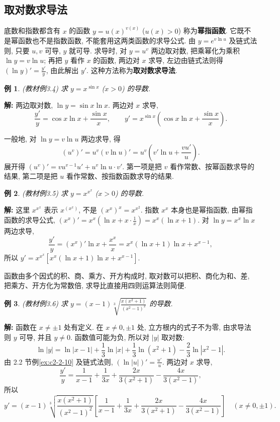\documentclass[UTF8,openany]{ctexbook}
\theoremstyle{chinesetextbook}
\newtheorem{example}{例}[section]
\newenvironment{cnsolution}{\par\indent\textbf{解:} \ignorespaces}{\par}
\begin{document}
\subsection{取对数求导法}
底数和指数都含有 $x$ 的函数 $y=u(x)^{v(x)}$ ($u(x)>0$) 称为\textbf{幂指函数}. 它既不是幂函数也不是指数函数, 不能套用这两类函数的求导公式. 由 $y=e^{v\ln u}$ 及链式法则, 只要 $u,v$ 可导, $y$ 就可导. 求导时, 对 $y=u^v$ 两边取对数, 把乘幂化为乘积 $\ln y=v\ln u$; 再把 $y$ 看作 $x$ 的函数, 两边对 $x$ 求导, 左边由链式法则得 $\displaystyle(\ln y)'=\frac{y'}y$, 由此解出 $y'$. 这种方法称为\textbf{取对数求导法}.
\begin{example}\label{ex:c2-3-4}
\textnormal{(教材例3.4)} 求 $y=x^{\sin x}$ ($x>0$) 的导数.
\end{example}
\begin{cnsolution}
两边取对数, $\ln y=\sin x\ln x$. 两边对 $x$ 求导,
\[
\frac{y'}y=\cos x\ln x+\frac{\sin x}x,\qquad y'=x^{\sin x}\left(\cos x\ln x+\frac{\sin x}x\right).
\]
\end{cnsolution}
一般地, 对 $\ln y=v\ln u$ 两边求导, 得
\[
\left(u^v\right)'=u^v(v\ln u)'=u^v\left(v'\ln u+\frac{vu'}u\right).
\]
展开得 $\left(u^v\right)'=vu^{v-1}u'+u^v\ln u\cdot v'$. 第一项是把 $v$ 看作常数、按幂函数求导的结果, 第二项是把 $u$ 看作常数、按指数函数求导的结果.
\begin{example}\label{ex:c2-3-5}
\textnormal{(教材例3.5)} 求 $y=x^{x^x}$ ($x>0$) 的导数.
\end{example}
\begin{cnsolution}
这里 $x^{x^x}$ 表示 $x^{(x^x)}$, 不是 $(x^x)^x=x^{x^2}$. 指数 $x^x$ 本身也是幂指函数, 由幂指函数的求导公式, $\displaystyle(x^x)'=x^x\left(\ln x+x\cdot\frac1x\right)=x^x(\ln x+1)$. 对 $\ln y=x^x\ln x$ 两边求导,
\[
\frac{y'}y=(x^x)'\ln x+\frac{x^x}x=x^x(\ln x+1)\ln x+x^{x-1},
\]
所以 $y'=x^{x^x}\left[x^x(\ln x+1)\ln x+x^{x-1}\right]$.
\end{cnsolution}
函数由多个因式的积、商、乘方、开方构成时, 取对数可以把积、商化为和、差, 把乘方、开方化为常数倍, 求导比直接用四则运算法则简便.
\begin{example}\label{ex:c2-3-6}
\textnormal{(教材例3.6)} 求 $\displaystyle y=(x-1)\sqrt[3]{\frac{x(x^2+1)}{(x^2-1)^2}}$ 的导数.
\end{example}
\begin{cnsolution}
函数在 $x\ne\pm1$ 处有定义. 在 $x\ne0,\pm1$ 处, 立方根内的式子不为零, 由求导法则 $y$ 可导, 并且 $y\ne0$. 函数值可能为负, 所以对 $|y|$ 取对数:
\[
\ln|y|=\ln|x-1|+\frac13\ln|x|+\frac13\ln(x^2+1)-\frac23\ln|x^2-1|.
\]
由 2.2 节例\ref{ex:c2-2-10} 及链式法则, $\displaystyle(\ln|u|)'=\frac{u'}u$. 两边对 $x$ 求导,
\[
\frac{y'}y=\frac1{x-1}+\frac1{3x}+\frac{2x}{3(x^2+1)}-\frac{4x}{3(x^2-1)},
\]
所以
\[
y'=(x-1)\sqrt[3]{\frac{x(x^2+1)}{(x^2-1)^2}}\left[\frac1{x-1}+\frac1{3x}+\frac{2x}{3(x^2+1)}-\frac{4x}{3(x^2-1)}\right]\quad(x\ne0,\pm1).
\]
\end{cnsolution}
\end{document}
